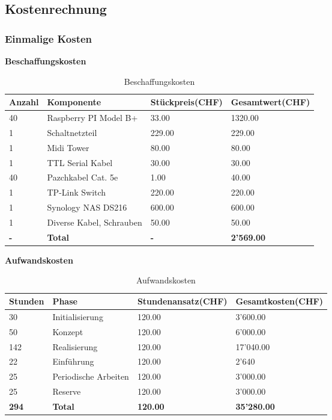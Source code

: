 
\subsection{Kostenrechnung}

\subsubsection{Einmalige Kosten}
\textbf{Beschaffungskosten}
\begin{table}[H]
\centering
\begin{tabular}{p{2cm}p{5cm}p{4cm}p{4cm}}
\hline
\rowcolor{heading} \textbf{Anzahl} & \textbf{Komponente} & \textbf{Stückpreis(CHF)} &\textbf{Gesamtwert(CHF)} \\\hline
40 & Raspberry PI Model B+ & 33.00 & 1320.00 \\\hline
1 & Schaltnetzteil & 229.00 & 229.00 \\\hline
1 & Midi Tower & 80.00 & 80.00 \\\hline
1 & TTL Serial Kabel & 30.00 & 30.00 \\\hline
40 & Pazchkabel Cat. 5e & 1.00 & 40.00 \\\hline
1 & TP-Link Switch & 220.00 & 220.00 \\\hline
1 & Synology NAS DS216 & 600.00 & 600.00 \\\hline
1 & Diverse Kabel, Schrauben & 50.00 & 50.00 \\\hline
\rowcolor{subheading}\textbf{-} & \textbf{Total} & \textbf{-} & \textbf{2'569.00} \\\hline
\end{tabular}
\caption{Beschaffungskosten}
\end{table}

\textbf{Aufwandskosten}
\begin{table}[H]
\centering
\begin{tabular}{p{2cm}p{5cm}p{4cm}p{4cm}}
\hline
\rowcolor{heading} \textbf{Stunden} & \textbf{Phase} & \textbf{Stundenansatz(CHF)} &\textbf{Gesamtkosten(CHF)} \\\hline
30 & Initialisierung & 120.00 & 3'600.00 \\\hline
50 & Konzept & 120.00 & 6'000.00 \\\hline
142 & Realisierung & 120.00 & 17'040.00 \\\hline
22 & Einführung & 120.00 & 2'640 \\\hline
25 & Periodische Arbeiten & 120.00 & 3'000.00 \\\hline
25 & Reserve & 120.00 & 3'000.00 \\\hline
\rowcolor{subheading}\textbf{294} & \textbf{Total} & \textbf{120.00} & \textbf{35'280.00} \\\hline
\end{tabular}
\caption{Aufwandskosten}
\end{table}

